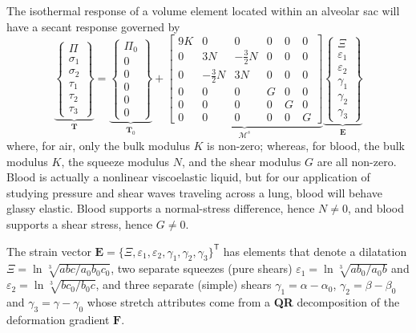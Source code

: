 The isothermal response of a volume element located within an alveolar sac will have a secant response governed by
\begin{equation}
    \underbrace{\left\{ \begin{matrix}
        \Pi \\ \sigma_1 \\ \sigma_2 \\ \tau_1 \\ \tau_2 \\ \tau_3
    \end{matrix} \right\}}_{\boldsymbol{T}} = 
    \underbrace{\left\{ \begin{matrix} 
        \Pi_0 \\ 0 \\ 0 \\ 0 \\ 0 \\ 0
    \end{matrix} \right\}}_{\boldsymbol{T}_0} +
    \underbrace{\begin{bmatrix}
        9K & 0 & 0 & 0 & 0 & 0 \\
        0 & 3N & -\frac{3}{2} N & 0 & 0 & 0 \\
        0 & -\frac{3}{2} N & 3N & 0 & 0 & 0 \\
        0 & 0 & 0 & G & 0 & 0 \\
        0 & 0 & 0 & 0 & G & 0 \\
        0 & 0 & 0 & 0 & 0 & G
    \end{bmatrix}}_{\boldsymbol{\mathcal{M}}^s} 
    \underbrace{\left\{ \begin{matrix} 
        \Xi \\ \varepsilon_1 \\ \varepsilon_2 \\ \gamma_1 \\ \gamma_2 \\ \gamma_3
    \end{matrix} \right\}}_{\boldsymbol{E}}
\end{equation}
where, for air, only the bulk modulus $K$ is non-zero; whereas, for blood, the bulk modulus $K$, the squeeze modulus $N$, and the shear modulus $G$ are all non-zero.  Blood is actually a nonlinear visco\-elastic liquid, but for our application of studying pressure and shear waves traveling across a lung, blood will behave glassy elastic.  Blood supports a normal-stress difference, hence $N \neq 0$, and blood supports a shear stress, hence $G \neq 0$.

The strain vector $\boldsymbol{E} = \{ \Xi, \varepsilon_1, \varepsilon_2, \gamma_1, \gamma_2, \gamma_3 \}^{\mathsf{T}}$ has elements that denote a dilatation $\Xi = \ln \sqrt[3]{abc/a_0b_0c_0}$, two separate squeezes (pure shears) $\varepsilon_1 = \ln \sqrt[3]{ab_0/a_0b}$ and $\varepsilon_2 = \ln \sqrt[3]{bc_0/b_0c}$, and three separate (simple) shears $\gamma_1 = \alpha - \alpha_0$, $\gamma_2 = \beta - \beta_0$ and $\gamma_3 = \gamma - \gamma_0$ whose stretch attributes come from a \textbf{QR} decomposition of the deformation gradient $\mathbf{F}$.

